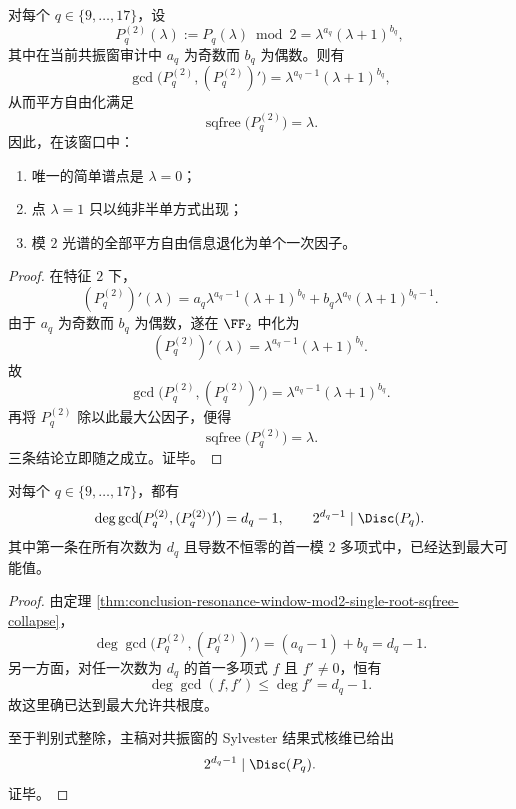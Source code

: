 \begin{theorem}[模 \(2\) 平方自由化的单根坍缩]\label{thm:conclusion-resonance-window-mod2-single-root-sqfree-collapse}
对每个 \(q\in\{9,\dots,17\}\)，设
\[
P_q^{(2)}(\lambda):=P_q(\lambda)\bmod 2
=
\lambda^{a_q}(\lambda+1)^{b_q},
\]
其中在当前共振窗审计中 \(a_q\) 为奇数而 \(b_q\) 为偶数。则有
\[
\gcd\!\bigl(P_q^{(2)},(P_q^{(2)})'\bigr)
=
\lambda^{a_q-1}(\lambda+1)^{b_q},
\]
从而平方自由化满足
\[
\operatorname{sqfree}\!\bigl(P_q^{(2)}\bigr)=\lambda.
\]
因此，在该窗口中：
\begin{enumerate}
\normalfont
  \item 唯一的简单谱点是 \(\lambda=0\)；
  \item 点 \(\lambda=1\) 只以纯非半单方式出现；
  \item 模 \(2\) 光谱的全部平方自由信息退化为单个一次因子。
\end{enumerate}
\end{theorem}
\begin{proof}
在特征 \(2\) 下，
\[
(P_q^{(2)})'(\lambda)
=
a_q\lambda^{a_q-1}(\lambda+1)^{b_q}
+
b_q\lambda^{a_q}(\lambda+1)^{b_q-1}.
\]
由于 \(a_q\) 为奇数而 \(b_q\) 为偶数，遂在 \(\FF_2\) 中化为
\[
(P_q^{(2)})'(\lambda)=\lambda^{a_q-1}(\lambda+1)^{b_q}.
\]
故
\[
\gcd\!\bigl(P_q^{(2)},(P_q^{(2)})'\bigr)
=
\lambda^{a_q-1}(\lambda+1)^{b_q}.
\]
再将 \(P_q^{(2)}\) 除以此最大公因子，便得
\[
\operatorname{sqfree}\!\bigl(P_q^{(2)}\bigr)=\lambda.
\]
三条结论立即随之成立。证毕。
\end{proof}

\begin{theorem}\label{thm:conclusion-resonance-window-mod2-maximal-coroot-discriminant}
对每个 \(q\in\{9,\dots,17\}\)，都有
\[
\deg \gcd\!\bigl(P_q^{(2)},(P_q^{(2)})'\bigr)=d_q-1,
\qquad
2^{d_q-1}\mid \Disc(P_q).
\]
其中第一条在所有次数为 \(d_q\) 且导数不恒零的首一模 \(2\) 多项式中，已经达到最大可能值。
\end{theorem}
\begin{proof}
由定理 \ref{thm:conclusion-resonance-window-mod2-single-root-sqfree-collapse}，
\[
\deg \gcd\!\bigl(P_q^{(2)},(P_q^{(2)})'\bigr)
=
(a_q-1)+b_q
=
d_q-1.
\]
另一方面，对任一次数为 \(d_q\) 的首一多项式 \(f\) 且 \(f'\neq 0\)，恒有
\[
\deg \gcd(f,f')\le \deg f'=d_q-1.
\]
故这里确已达到最大允许共根度。

至于判别式整除，主稿对共振窗的 Sylvester 结果式核维已给出
\[
2^{d_q-1}\mid \Disc(P_q).
\]
证毕。
\end{proof}

